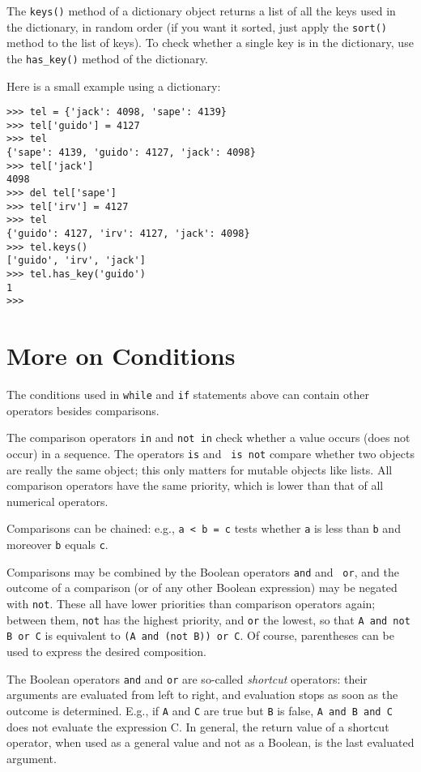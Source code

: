 The {\tt keys()} method of a dictionary object returns a list of all the
keys used in the dictionary, in random order (if you want it sorted,
just apply the {\tt sort()} method to the list of keys).  To check
whether a single key is in the dictionary, use the \verb/has_key()/
method of the dictionary.

Here is a small example using a dictionary:

\bcode\begin{verbatim}
>>> tel = {'jack': 4098, 'sape': 4139}
>>> tel['guido'] = 4127
>>> tel
{'sape': 4139, 'guido': 4127, 'jack': 4098}
>>> tel['jack']
4098
>>> del tel['sape']
>>> tel['irv'] = 4127
>>> tel
{'guido': 4127, 'irv': 4127, 'jack': 4098}
>>> tel.keys()
['guido', 'irv', 'jack']
>>> tel.has_key('guido')
1
>>> 
\end{verbatim}\ecode

\section{More on Conditions}

The conditions used in {\tt while} and {\tt if} statements above can
contain other operators besides comparisons.

The comparison operators {\tt in} and {\tt not in} check whether a value
occurs (does not occur) in a sequence.  The operators {\tt is} and {\tt
is not} compare whether two objects are really the same object; this
only matters for mutable objects like lists.  All comparison operators
have the same priority, which is lower than that of all numerical
operators.

Comparisons can be chained: e.g., {\tt a < b = c} tests whether {\tt a}
is less than {\tt b} and moreover {\tt b} equals {\tt c}.

Comparisons may be combined by the Boolean operators {\tt and} and {\tt
or}, and the outcome of a comparison (or of any other Boolean
expression) may be negated with {\tt not}.  These all have lower
priorities than comparison operators again; between them, {\tt not} has
the highest priority, and {\tt or} the lowest, so that
{\tt A and not B or C} is equivalent to {\tt (A and (not B)) or C}.  Of
course, parentheses can be used to express the desired composition.

The Boolean operators {\tt and} and {\tt or} are so-called {\em
shortcut} operators: their arguments are evaluated from left to right,
and evaluation stops as soon as the outcome is determined.  E.g., if
{\tt A} and {\tt C} are true but {\tt B} is false, {\tt A and B and C}
does not evaluate the expression C.  In general, the return value of a
shortcut operator, when used as a general value and not as a Boolean, is
the last evaluated argument.

